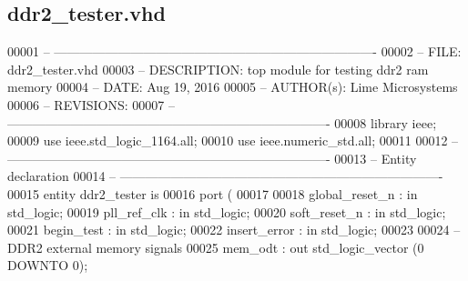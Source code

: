 \subsection{ddr2\+\_\+tester.\+vhd}
\label{ddr2__tester_8vhd_source}

\begin{DoxyCode}
00001 \textcolor{keyword}{-- ---------------------------------------------------------------------------- }
00002 \textcolor{keyword}{-- FILE:    ddr2\_tester.vhd}
00003 \textcolor{keyword}{-- DESCRIPTION: top module for testing ddr2 ram memory}
00004 \textcolor{keyword}{-- DATE:    Aug 19, 2016}
00005 \textcolor{keyword}{-- AUTHOR(s):   Lime Microsystems}
00006 \textcolor{keyword}{-- REVISIONS:}
00007 \textcolor{keyword}{-- ---------------------------------------------------------------------------- }
00008 \textcolor{vhdlkeyword}{library }\textcolor{keywordflow}{ieee};
00009 \textcolor{vhdlkeyword}{use }ieee.std\_logic\_1164.\textcolor{keywordflow}{all};
00010 \textcolor{vhdlkeyword}{use }ieee.numeric\_std.\textcolor{keywordflow}{all};
00011 
00012 \textcolor{keyword}{-- ----------------------------------------------------------------------------}
00013 \textcolor{keyword}{-- Entity declaration}
00014 \textcolor{keyword}{-- ----------------------------------------------------------------------------}
00015 \textcolor{keywordflow}{entity }ddr2_tester \textcolor{keywordflow}{is}
00016   \textcolor{keywordflow}{port} \textcolor{vhdlchar}{(}
00017 
00018         \textcolor{vhdlchar}{global_reset_n}          \textcolor{vhdlchar}{:} \textcolor{keywordflow}{in} \textcolor{comment}{std\_logic};
00019         \textcolor{vhdlchar}{pll_ref_clk}             \textcolor{vhdlchar}{:} \textcolor{keywordflow}{in} \textcolor{comment}{std\_logic};
00020         \textcolor{vhdlchar}{soft_reset_n}            \textcolor{vhdlchar}{:} \textcolor{keywordflow}{in} \textcolor{comment}{std\_logic};
00021 \textcolor{vhdlkeyword}{        begin}\textcolor{vhdlchar}{\_test}              \textcolor{vhdlchar}{:} \textcolor{keywordflow}{in} \textcolor{comment}{std\_logic};
00022         \textcolor{vhdlchar}{insert_error}            \textcolor{vhdlchar}{:} \textcolor{keywordflow}{in} \textcolor{comment}{std\_logic};
00023 
00024 \textcolor{keyword}{      --DDR2 external memory signals    }
00025         \textcolor{vhdlchar}{mem_odt}                 \textcolor{vhdlchar}{:} \textcolor{keywordflow}{out} \textcolor{comment}{std\_logic\_vector} \textcolor{vhdlchar}{(}\textcolor{vhdllogic}{}\textcolor{vhdllogic}{0} \textcolor{keywordflow}{DOWNTO} \textcolor{vhdllogic}{}\textcolor{vhdllogic}{0}\textcolor{vhdlchar}{)};

\end{DoxyCode}
